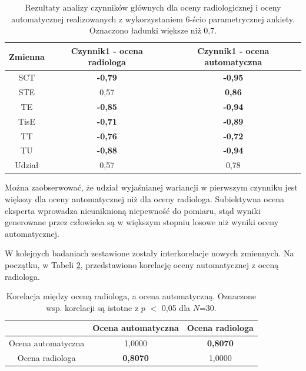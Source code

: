 \begin{table}[h]
	\centering
	\setlength{\tabcolsep}{3pt}
	\setlength\extrarowheight{2pt}
	\caption{Rezultaty analizy czynników głównych dla oceny radiologicznej i oceny automatycznej realizowanych z wykorzystaniem 6-ścio parametrycznej ankiety. Oznaczono ładunki większe niż 0,7.}
	\label{tab:pca-gt-pred}
	\begin{tabular}{c|c|c}
		Zmienna&Czynnik1 - ocena radiologa&Czynnik1 - ocena automatyczna \\
		\hline \hline
		SCT&\textbf{-0,79}&\textbf{-0,95}\\
		\hline
		STE&0,57&\textbf{0,86}\\
		\hline
		TE&\textbf{-0,85}&\textbf{-0,94}\\
		\hline
		TisE&\textbf{-0,71}&\textbf{-0,89}\\
		\hline
		TT&\textbf{-0,76}&\textbf{-0,72}\\
		\hline
		TU&\textbf{-0,88}&\textbf{-0,94}\\
		\hline \hline	
		Udział&0,57&0,78\\
			
	\end{tabular}
\end{table}

Można zaobserwować, że udział wyjaśnianej wariancji w pierwszym czynniku jest większy dla oceny automatycznej niż dla oceny radiologa. Subiektywna ocena eksperta wprowadza nieuniknioną niepewność do pomiaru, stąd wyniki generowane przez człowieka są w większym stopniu losowe niż wyniki oceny automatycznej. 

W kolejnych badaniach zestawione zostały interkorelacje nowych zmiennych. Na początku, w Tabeli \ref{tab:gtVSpred}, przedstawiono korelację oceny automatycznej z oceną radiologa.


\begin{table}[h]
	\centering
	\setlength{\tabcolsep}{3pt}
	\setlength\extrarowheight{2pt}
	\caption{Korelacja między oceną radiologa, a ocena automatyczną. Oznaczone wsp. korelacji są istotne z $p$ $<$ 0,05 dla $N$=30.}
	\label{tab:gtVSpred}
	\begin{tabular}{c|c|c}
		&Ocena automatyczna &Ocena radiologa \\
		\hline \hline
		Ocena automatyczna&1,0000&\textbf{0,8070}\\
		\hline
		Ocena radiologa&\textbf{0,8070}&1,0000\\
			
	\end{tabular}
\end{table}

